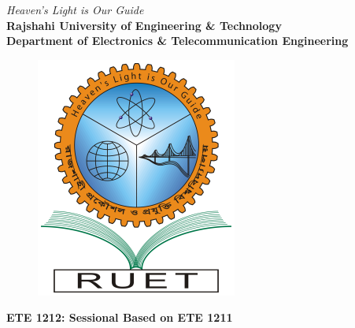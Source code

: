 \begin{titlepage}
  \begin{center}
    \textit{Heaven's Light is Our Guide}
    \\[0.5cm]
    \textbf{\Large Rajshahi University of Engineering \& Technology}
    \\[0.3cm]
    \textbf{\large Department of Electronics \& Telecommunication Engineering}
    \\[0.2cm]
    \begin{figure}[!htbp]
      \centering
      \includegraphics[scale=0.3]{src/logo_ruet}
      \label{fig:RUET logo}
    \end{figure}
    \textbf{\Large ETE 1212: Sessional Based on ETE 1211 }
    \\[0.5cm]
    \myrule[1pt][5pt]



\end{center}
\end{titlepage}
